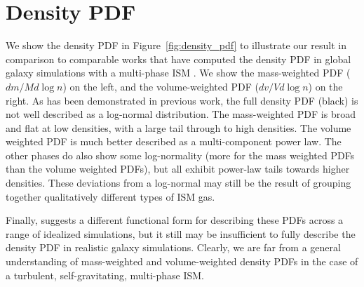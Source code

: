 
%
%



\setcounter{section}{0}%
\renewcommand\thesection{\thechapter.\Alph{section}}


\section{Density PDF}
\label{appendix:density PDF}
We show the density PDF in Figure~\ref{fig:density_pdf} to illustrate our result in comparison to comparable works that have computed the density PDF in global galaxy simulations with a multi-phase ISM \citep{Joung2009, Tasker2009, Tasker2011, Tasker2015,HQM2012}. We show the mass-weighted PDF ($dm/Md\log n$) on the left, and the volume-weighted PDF ($dv/Vd\log n$) on the right. As has been demonstrated in previous work, the full density PDF (black) is not well described as a log-normal distribution. The mass-weighted PDF is broad and flat at low densities, with a large tail through to high densities.   The volume weighted PDF is much better described as a multi-component power law. The other phases do also show some log-normality (more for the mass weighted PDFs than the volume weighted PDFs), but all exhibit power-law tails towards higher densities. These deviations from a log-normal may still be the result of grouping together qualitatively different types of ISM gas. 

Finally, \cite{Hopkins2013} suggests a different functional form for describing these PDFs across a range of idealized simulations, but it still may be insufficient to fully describe the density PDF in realistic galaxy simulations. Clearly, we are far from a general understanding of mass-weighted and volume-weighted density PDFs in the case of a turbulent, self-gravitating, multi-phase ISM.

